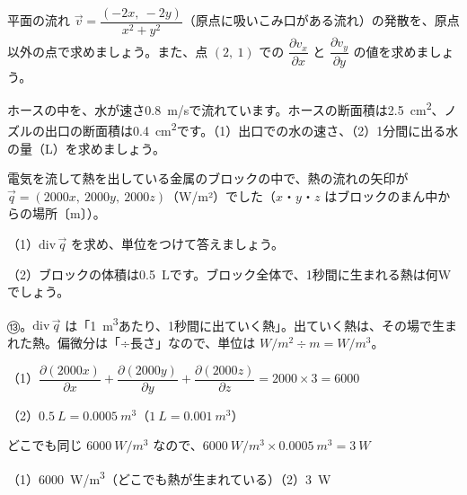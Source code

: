 \begingroup{}%
\noindent\begin{minipage}[t]{0.485\linewidth}\vspace{0pt}
\begin{jibun}
\raggedright 平面の流れ $\vec v=\dfrac{(-2x,\ -2y)}{x^2+y^2}$（原点に吸いこみ口がある流れ）の発散を、原点以外の点で求めましょう。また、点 $(2,\ 1)$ での $\dfrac{\partial v_x}{\partial x}$ と $\dfrac{\partial v_y}{\partial y}$ の値を求めましょう。
\end{jibun}
\end{minipage}\hfill
\begin{minipage}[t]{0.485\linewidth}\vspace{0pt}
\begin{jibun}
\raggedright ホースの中を、水が速さ\qty{0.8}{m/s}で流れています。ホースの断面積は\qty{2.5}{cm^2}、ノズルの出口の断面積は\qty{0.4}{cm^2}です。（1）出口での水の速さ、（2）1分間に出る水の量（L）を求めましょう。
\end{jibun}
\end{minipage}\par
\endgroup


\begin{reidai}
電気を流して熱を出している金属のブロックの中で、熱の流れの矢印が $\vec q=(2000x,\ 2000y,\ 2000z)$（W/m²）でした（$x$・$y$・$z$ はブロックのまん中からの場所〔m〕）。\par
（1）$\mathrm{div}\,\vec q$ を求め、単位をつけて答えましょう。\par
（2）ブロックの体積は\qty{0.5}{L}です。ブロック全体で、1秒間に生まれる熱は何Wでしょう。\par
\kangaekata ⑬。$\mathrm{div}\,\vec q$ は「\qty{1}{m^3}あたり、1秒間に出ていく熱」。出ていく熱は、その場で生まれた熱。偏微分は「÷長さ」なので、単位は $\unit{W/m^2}\div\unit{m}=\unit{W/m^3}$。\par
\shiki\kviiijs{}\zw{} （1）$\dfrac{\partial(2000x)}{\partial x}+\dfrac{\partial(2000y)}{\partial y}+\dfrac{\partial(2000z)}{\partial z}=2000\times3=6000$\par
\kviiija （2）$\qty{0.5}{L}=\qty{0.0005}{m^3}$（$\qty{1}{L}=\qty{0.001}{m^3}$）\par
\kviiijb どこでも同じ $\qty{6000}{W/m^3}$ なので、$\qty{6000}{W/m^3}\times\qty{0.0005}{m^3}=\qty{3}{W}$\par
\kotae\kviiijs{}\zw{} （1）\qty{6000}{W/m^3}（どこでも熱が生まれている）\quad （2）\qty{3}{W}
\end{reidai}

